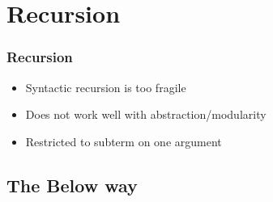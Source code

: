 \section{Recursion}

\begin{frame}
  \frametitle{Recursion}
  
  \begin{itemize}
  \item Syntactic recursion is too fragile
  \item Does not work well with abstraction/modularity
  \item Restricted to subterm on one argument
  \end{itemize}

\end{frame}

\subsection{The Below way}

